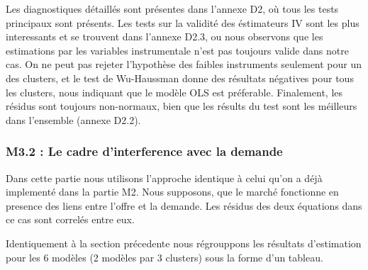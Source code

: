 \documentclass[11pt,]{article}
\begin{document}
Les diagnostiques détaillés sont présentes dans l'annexe D2, où tous les
tests principaux sont présents. Les tests sur la validité des
éstimateurs IV sont les plus interessants et se trouvent dans l'annexe
D2.3, ou nous observons que les estimations par les variables
instrumentale n'est pas toujours valide dans notre cas. On ne peut pas
rejeter l'hypothèse des faibles instruments seulement pour un des
clusters, et le test de Wu-Haussman donne des résultats négatives pour
tous les clusters, nous indiquant que le modèle OLS est préferable.
Finalement, les résidus sont toujours non-normaux, bien que les résults
du test sont les méilleurs dans l'ensemble (annexe D2.2).

\hypertarget{m3.2-le-cadre-dinterference-avec-la-demande}{%
\subsubsection{M3.2 : Le cadre d'interference avec la
demande}\label{m3.2-le-cadre-dinterference-avec-la-demande}}

Dans cette partie nous utilisons l'approche identique à celui qu'on a
déjà implementé dans la partie M2. Nous supposons, que le marché
fonctionne en presence des liens entre l'offre et la demande. Les
résidus des deux équations dans ce cas sont correlés entre eux.

Identiquement à la section précedente nous régrouppons les résultats
d'estimation pour les 6 modèles (2 modèles par 3 clusters) sous la forme
d'un tableau.

\FloatBarrier
\end{document}
